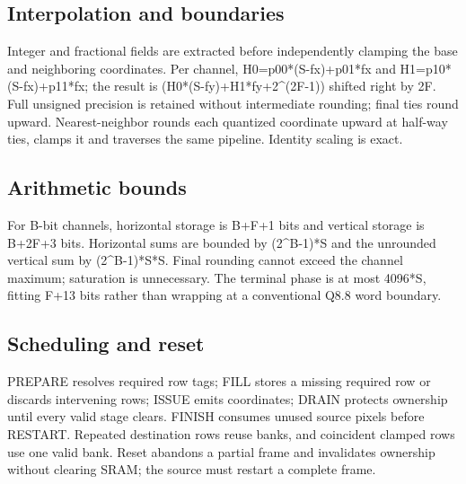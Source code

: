 \documentclass[11pt,a4paper]{article}
\begin{document}
\subsection{Interpolation and boundaries}

Integer and fractional fields are extracted before independently clamping the base and neighboring coordinates. Per channel,\allowbreak{} H0=\allowbreak{}p00*\allowbreak{}(\allowbreak{}S-fx)\allowbreak{}+\allowbreak{}p01*\allowbreak{}fx and H1=\allowbreak{}p10*\allowbreak{}(\allowbreak{}S-fx)\allowbreak{}+\allowbreak{}p11*\allowbreak{}fx; the result is (\allowbreak{}H0*\allowbreak{}(\allowbreak{}S-fy)\allowbreak{}+\allowbreak{}H1*\allowbreak{}fy+\allowbreak{}2\textasciicircum{}(\allowbreak{}2F-1)\allowbreak{})\allowbreak{} shifted right by 2F. Full unsigned precision is retained without intermediate rounding; final ties round upward. Nearest-neighbor rounds each quantized coordinate upward at half-way ties,\allowbreak{} clamps it and traverses the same pipeline. Identity scaling is exact.

\subsection{Arithmetic bounds}

For B-bit channels,\allowbreak{} horizontal storage is B+\allowbreak{}F+\allowbreak{}1 bits and vertical storage is B+\allowbreak{}2F+\allowbreak{}3 bits. Horizontal sums are bounded by (\allowbreak{}2\textasciicircum{}B-1)\allowbreak{}*\allowbreak{}S and the unrounded vertical sum by (\allowbreak{}2\textasciicircum{}B-1)\allowbreak{}*\allowbreak{}S*\allowbreak{}S. Final rounding cannot exceed the channel maximum; saturation is unnecessary. The terminal phase is at most 4096*\allowbreak{}S,\allowbreak{} fitting F+\allowbreak{}13 bits rather than wrapping at a conventional Q8.8 word boundary.

\subsection{Scheduling and reset}

PREPARE resolves required row tags; FILL stores a missing required row or discards intervening rows; ISSUE emits coordinates; DRAIN protects ownership until every valid stage clears. FINISH consumes unused source pixels before RESTART. Repeated destination rows reuse banks,\allowbreak{} and coincident clamped rows use one valid bank. Reset abandons a partial frame and invalidates ownership without clearing SRAM; the source must restart a complete frame.
\end{document}
